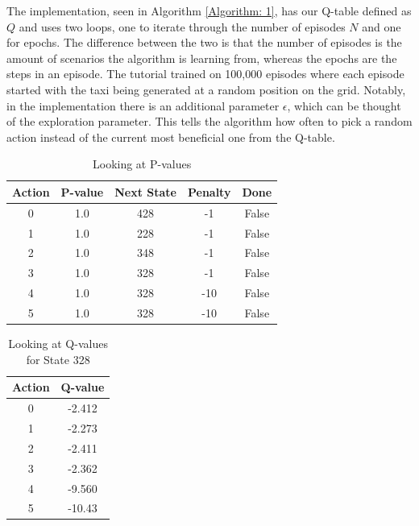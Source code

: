 \documentclass[10pt,twocolumn]{article}
\begin{document}
The implementation, seen in Algorithm \ref{Algorithm: 1}, has our Q-table defined as $Q$ and uses two loops, one to iterate through the number of episodes $N$ and one for epochs.
The difference between the two is that the number of episodes is the amount of scenarios the algorithm is learning from, whereas the epochs are the steps in an episode.
The tutorial trained on 100,000 episodes where each episode started with the taxi being generated at a random position on the grid.
Notably, in the implementation there is an additional parameter $\epsilon$, which can be thought of the exploration parameter.
This tells the algorithm how often to pick a random action instead of the current most beneficial one from the Q-table.

\begin{table}[ht]
    \vspace{1cm}
    \centering
    \caption{Looking at P-values}
    \label{Table:1}
    \begin{tabular}{ || c c c c c|| }
      \hline
        Action & P-value & Next State & Penalty & Done \\ \hline \hline
        0 & 1.0 & 428 & -1 & False \\ \hline
        1 & 1.0 & 228 & -1 & False \\ \hline
        2 & 1.0 & 348 & -1 & False \\ \hline
        3 & 1.0 & 328 & -1 & False \\ \hline
        4 & 1.0 & 328 & -10 & False \\ \hline
        5 & 1.0 & 328 & -10 & False \\ \hline
    \end{tabular}
\end{table}

\begin{table}[ht]
    \vspace{1cm}
    \centering
    \caption{Looking at Q-values for State 328}
    \label{Table:2}
    \begin{tabular}{ || c c || }
      \hline
        Action & Q-value \\ \hline \hline
        0 & -2.412 \\ \hline
        1 & -2.273 \\ \hline
        2 & -2.411 \\ \hline
        3 & -2.362 \\ \hline
        4 & -9.560 \\ \hline
        5 & -10.43 \\ \hline
    \end{tabular}
\end{table}
\end{document}
